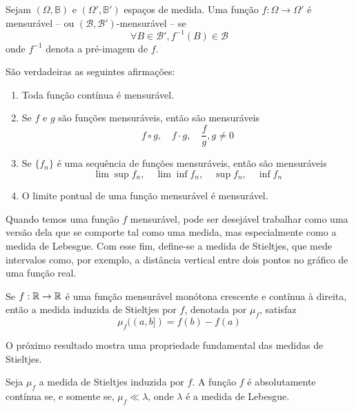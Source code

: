 \begin{def:funcao mensuravel}
\label{def:funcao mensuravel}
Sejam $(\Omega, \mathbb{B})$ e $(\Omega', \mathbb{B}')$	espaços de medida. Uma função
$f: \Omega \to \Omega'$ é mensurável -- ou $(\mathcal{B}, \mathcal{B}')$-mensurável --
se
\[
	\forall B \in \mathcal{B}', f^{-1}(B) \in \mathcal{B}
\]
onde $f^{-1}$ denota a pré-imagem de $f$.
\end{def:funcao mensuravel}

\begin{thm:funcoes mensuraveis}
\label{thm:funcoes mensuraveis}
São verdadeiras as seguintes afirmações:
\begin{enumerate}
	\item[i.] Toda função contínua é mensurável.
	\item[ii.] Se $f$ e $g$ são funções mensuráveis, então são mensuráveis
	      \[
		      f \circ g, \quad f \cdot g, \quad \frac{f}{g}, g \ne 0
	      \]
	\item[iii.] Se $\{f_n\}$ é uma sequência de funções mensuráveis, então são mensuráveis
	      \[
		      \lim \sup f_n, \quad \lim \inf f_n, \quad \sup f_n, \quad \inf f_n
	      \]
	\item[iv.] O limite pontual de uma função mensurável é mensurável.
\end{enumerate}
\end{thm:funcoes mensuraveis}

Quando temos uma função $f$ mensurável, pode ser desejável trabalhar como uma versão
dela que se comporte tal como uma medida, mas especialmente como a medida de Lebesgue.
Com esse fim, define-se a medida de Stieltjes, que mede intervalos como, por exemplo,
a distância vertical entre dois pontos no gráfico de uma função real.

\begin{def:steltjes}
\label{def:steljes}
Se $f: \mathbb{R} \to \mathbb{R}$ é uma função mensurável monótona crescente e contínua à direita,
então a medida induzida de Stieltjes por $f$, denotada por $\mu_f$, satisfaz
\[
	\mu_f((a, b]) = f(b) - f(a)
\]
\end{def:steltjes}

O próximo resultado mostra uma propriedade fundamental das medidas de Stieltjes.

\begin{thm:medida steltjes}
\label{thm:medida steltjes}
Seja $\mu_f$ a medida de Stieltjes induzida por $f$.
A função $f$ é absolutamente contínua se, e somente se, $\mu_f \ll \lambda$, onde $\lambda$
é a medida de Lebesgue.
\end{thm:medida steltjes}

